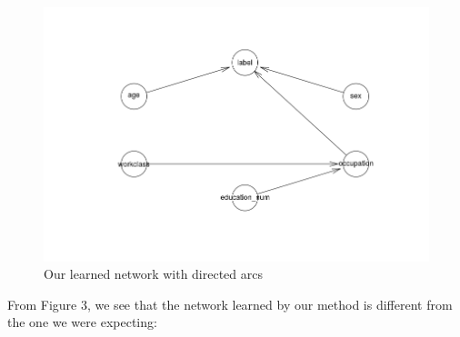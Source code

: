 \documentclass{article}
\begin{document}
\begin{figure}[htb]
\centering
\includegraphics[width=.9\linewidth]{./img/net_cl_dir.png}
\caption{Our learned network with directed arcs}
\end{figure}

From Figure 3, we see that the network learned by our method is different from the one we were
expecting: 
\end{document}

